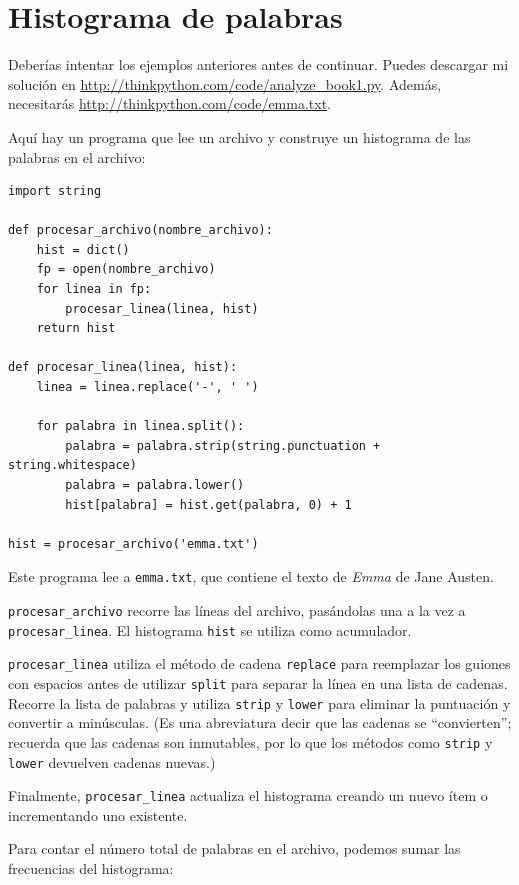 \documentclass[10pt]{book}
\begin{document}
\section{Histograma de palabras}

Deberías intentar los ejemplos anteriores antes de continuar.
Puedes descargar mi solución en
 \url{http://thinkpython.com/code/analyze_book1.py}.  Además,
necesitarás \url{http://thinkpython.com/code/emma.txt}.

Aquí hay un programa que lee un archivo y construye un histograma de las
palabras en el archivo:

\begin{verbatim}
import string

def procesar_archivo(nombre_archivo):
    hist = dict()
    fp = open(nombre_archivo)
    for linea in fp:
        procesar_linea(linea, hist)
    return hist

def procesar_linea(linea, hist):
    linea = linea.replace('-', ' ')

    for palabra in linea.split():
        palabra = palabra.strip(string.punctuation + string.whitespace)
        palabra = palabra.lower()
        hist[palabra] = hist.get(palabra, 0) + 1

hist = procesar_archivo('emma.txt')
\end{verbatim}
%
Este programa lee a {\tt emma.txt}, que contiene el texto de {\em
  Emma} de Jane Austen.

\verb"procesar_archivo" recorre las líneas del archivo,
pasándolas una a la vez a \verb"procesar_linea".  El histograma
{\tt hist} se utiliza como acumulador.

\verb"procesar_linea" utiliza el método de cadena {\tt replace} para reemplazar
los guiones con espacios antes de utilizar {\tt split} para separar la línea en una
lista de cadenas.  Recorre la lista de palabras y utiliza {\tt strip}
y {\tt lower} para eliminar la puntuación y convertir a minúsculas.  (Es
una abreviatura decir que las cadenas se ``convierten''; recuerda que
las cadenas son inmutables, por lo que los métodos como {\tt strip} y {\tt lower}
devuelven cadenas nuevas.)

Finalmente, \verb"procesar_linea" actualiza el histograma creando un nuevo
ítem o incrementando uno existente.

Para contar el número total de palabras en el archivo, podemos sumar
las frecuencias del histograma:
\end{document}
